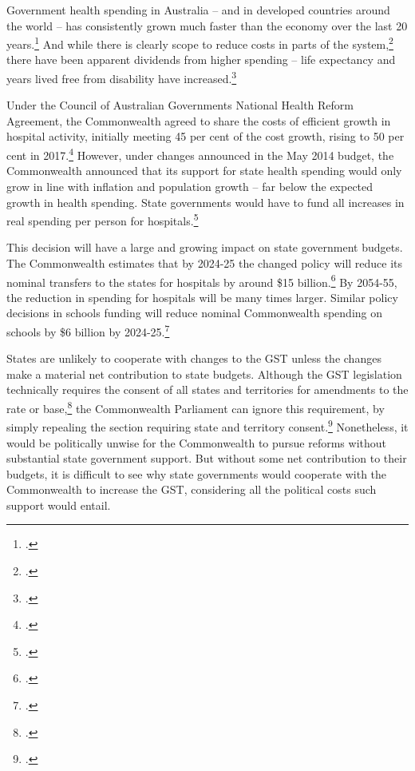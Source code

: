 Government health spending in Australia – and in developed countries around the world – has consistently grown much faster than the economy over the last 20 years.\footcites[][25--27]{DaleyWoodWeidmannEtAl2014}[][17]{DaleyMcGannonHunter2014}  And while there is clearly scope to reduce costs in parts of the system,\footcites{DuckettBreadonGinnivanEtAl2013}{DuckettBreadonRomanesEtAl2015}  there have been apparent dividends from higher spending – life expectancy and years lived free from disability have increased.\footcite[][16]{Daley2015}  

Under the Council of Australian Governments National Health Reform Agreement, the Commonwealth agreed to share the costs of efficient growth in hospital activity, initially meeting 45 per cent of the cost growth, rising to 50 per cent in 2017.\footcite[][13]{COAG2011}  However, under changes announced in the May 2014 budget, the Commonwealth announced that its support for state health spending would only grow in line with inflation and population growth – far below the expected growth in health spending.  State governments would have to fund all increases in real spending per person for hospitals.\footcite[][Budget Paper No.~2, p.~126]{Treasury2014-Budget-Papers-2014-15}  

This decision will have a large and growing impact on state government budgets. The Commonwealth estimates that by 2024-25 the changed policy will reduce its nominal transfers to the states for hospitals by around \$15 billion.\footcite[][115]{SenateEconomicsLegislationCommittee2014}  By 2054-55, the reduction in spending for hospitals will be many times larger.  Similar policy decisions in schools funding will reduce nominal Commonwealth spending on schools by \$6 billion by 2024-25.\footcite[][115]{SenateEconomicsLegislationCommittee2014}

States are unlikely to cooperate with changes to the GST unless the changes make a material net contribution to state budgets. Although the GST legislation technically requires the consent of all states and territories for amendments to the rate or base,\footcite[][\S11]{GST-Act-Rate-Base-1999}  the Commonwealth Parliament can ignore this requirement, by simply repealing the section requiring state and territory consent.\footcite{Twomey2003}  Nonetheless, it would be politically unwise for the Commonwealth to pursue reforms without substantial state government support. But without some net contribution to their budgets, it is difficult to see why state governments would cooperate with the Commonwealth to increase the GST, considering all the political costs such support would entail. 

